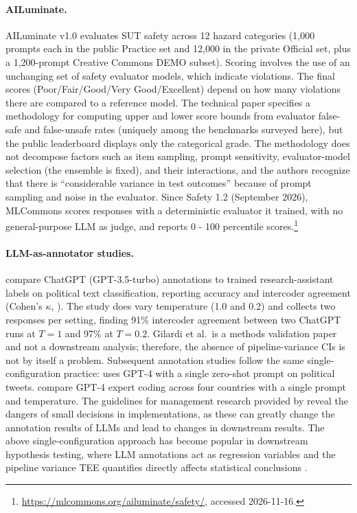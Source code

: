\paragraph{AILuminate.} AILuminate v1.0 \citep{ghosh2025ailuminate} evaluates SUT safety across 12 hazard categories (1,000 prompts each in the public Practice set and 12,000 in the private Official set, plus a 1,200-prompt Creative Commons DEMO subset). Scoring involves the use of an unchanging set of safety evaluator models, which indicate violations. The final scores (Poor/Fair/Good/Very Good/Excellent) depend on how many violations there are compared to a reference model. The technical paper specifies a methodology for computing upper and lower score bounds from evaluator false-safe and false-unsafe rates (uniquely among the benchmarks surveyed here), but the public leaderboard displays only the categorical grade. The methodology does not decompose factors such as item sampling, prompt sensitivity, evaluator-model selection (the ensemble is fixed), and their interactions, and the authors recognize that there is ``considerable variance in test outcomes'' because of prompt sampling and noise in the evaluator. Since Safety 1.2 (September 2026), MLCommons scores responses with a deterministic evaluator it trained, with no general-purpose LLM as judge, and reports 0 - 100 percentile scores.\footnote{\url{https://mlcommons.org/ailuminate/safety/}, accessed 2026-11-16.}

\paragraph{LLM-as-annotator studies.} \citet{gilardi2023chatgpt} compare ChatGPT (GPT-3.5-turbo) annotations to trained research-assistant labels on political text classification, reporting accuracy and intercoder agreement (Cohen's $\kappa$, \citealt{cohen1960kappa}). The study does vary temperature (1.0 and 0.2) and collects two responses per setting, finding 91\% intercoder agreement between two ChatGPT runs at $T = 1$ and 97\% at $T = 0.2$. Gilardi et al.\ is a methods validation paper and not a downstream analysis; therefore, the absence of pipeline-variance CIs is not by itself a problem. Subsequent annotation studies follow the same single-configuration practice: \citet{tornberg2025llm} uses GPT-4 with a single zero-shot prompt on political tweets. \citet{heseltine2024llm} compare GPT-4 expert coding across four countries with a single prompt and temperature. The guidelines for management research provided by \citet{carlson2026smj} reveal the dangers of small decisions in implementations, as these can greatly change the annotation results of LLMs and lead to changes in downstream results. The above single-configuration approach has become popular in downstream hypothesis testing, where LLM annotations act as regression variables and the pipeline variance TEE quantifies directly affects statistical conclusions \citep{baumann2025llmhacking, egami2024dsl}.



